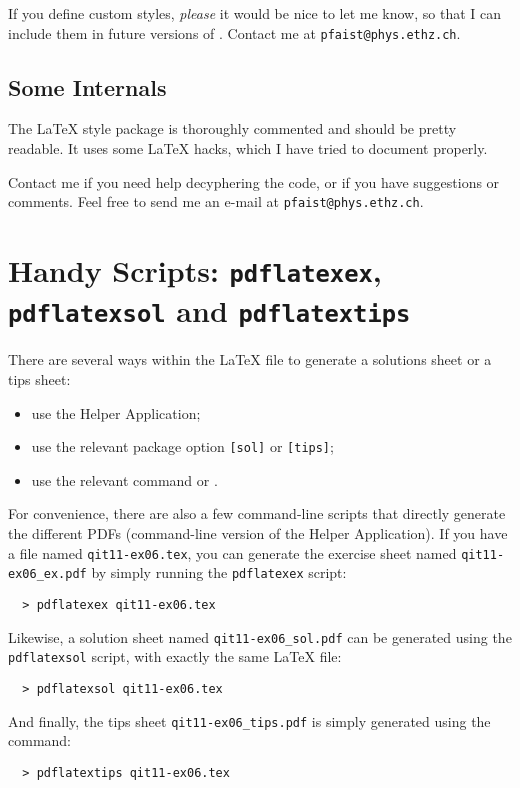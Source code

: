 \documentclass[11pt,a4paper]{article}
\begin{document}
\begin{pkgnotice}
  If you define custom styles, \emph{please} it would be nice to let me know, so that I
  can include them in future versions of \ethuebung{}. Contact me at
  \texttt{pfaist{@}phys.ethz.ch}.
\end{pkgnotice}






\subsection{Some Internals}
\label{sec:Internals}

The \LaTeX{} style package is thoroughly commented and should be pretty readable. It uses
some \LaTeX{} hacks, which I have tried to document properly.

Contact me if you need help decyphering the code, or if you have suggestions or
comments. Feel free to send me an e-mail at \texttt{pfaist{@}phys.ethz.ch}.


\section{Handy Scripts: \texttt{pdflatexex}, \texttt{pdflatexsol} and \texttt{pdflatextips}}
\label{sec:handyscriptspdflatex}

There are several ways within the \LaTeX{} file to generate a solutions sheet or a tips
sheet:
\begin{itemize}
\item use the Helper Application;
\item use the relevant package option \texttt{[sol]} or \texttt{[tips]};
\item use the relevant command  or
  .
\end{itemize}

For convenience, there are also a few command-line scripts that directly generate the
different PDFs (command-line version of the Helper Application). If you have a file named
\texttt{qit11-ex06.tex}, you can generate the exercise sheet named
\verb|qit11-ex06_ex.pdf| by simply running the \texttt{pdflatexex} script:
\begin{pkgverbatim}
\begin{verbatim}
  > pdflatexex qit11-ex06.tex
\end{verbatim}
\end{pkgverbatim}
Likewise, a solution sheet named \verb|qit11-ex06_sol.pdf| can be generated using the
\texttt{pdflatexsol} script, with exactly the same \LaTeX{} file:
\begin{pkgverbatim}
\begin{verbatim}
  > pdflatexsol qit11-ex06.tex
\end{verbatim}
\end{pkgverbatim}
And finally, the tips sheet \verb|qit11-ex06_tips.pdf| is simply generated using the
command:
\begin{pkgverbatim}
\begin{verbatim}
  > pdflatextips qit11-ex06.tex
\end{verbatim}
\end{pkgverbatim}
\end{document}
